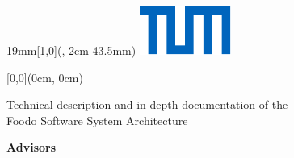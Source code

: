 
\newcommand{\SeitenrandOben}{43.5mm}
\newcommand{\SeitenrandRechts}{20mm}
\newcommand{\SeitenrandLinks}{20mm}
\newcommand{\SeitenrandUnten}{10mm}

\newcommand{\UniversitaetLogoBreite}{19mm}
\newcommand{\UniversitaetLogoHoehe}{1cm}

\usepackage[a4paper,
    top=\SeitenrandOben,
    bottom=\SeitenrandUnten,
    inner=\SeitenrandLinks,
    outer=\SeitenrandRechts,
    foot=0cm,
    head=0cm
]{geometry}

\usepackage{tabularx}

\textblockorigin{\SeitenrandLinks}{\SeitenrandOben} %

\setlength{\parindent}{0pt}
\setlength{\parskip}{\baselineskip}
\TabPositions{4cm}
\pagestyle{empty}






\begin{textblock*}{\UniversitaetLogoBreite}[1,0](\textwidth-1mm, 2cm-\SeitenrandOben)%
    \raggedleft\includegraphics{./Ressourcen/Universitaet_Logo_RGB.pdf}%
\end{textblock*}


\begin{textblock*}{\textwidth}[0,0](0cm, 0cm)%
{\fontsize{24pt}{26pt}\selectfont\textbf{\Titel}}

\vspace*{14pt}
{\fontsize{18pt}{27pt}\selectfont\textbf{\Untertitel}}
\end{textblock*}

\vspace*{92.2mm}
\fontsize{15pt}{17.5pt}\selectfont%
Technical description and in-depth documentation of the \\ Foodo Software System Architecture

\renewcommand{\baselinestretch}{1.47}
\normalsize\selectfont
\vspace*{17.1mm}
\textbf{Advisors}\tab
\begin{minipage}[t]{\textwidth-\CurrentLineWidth}
\BetreutVonPerson\\
\BetreutVonLehrstuhl\strut
\end{minipage}

